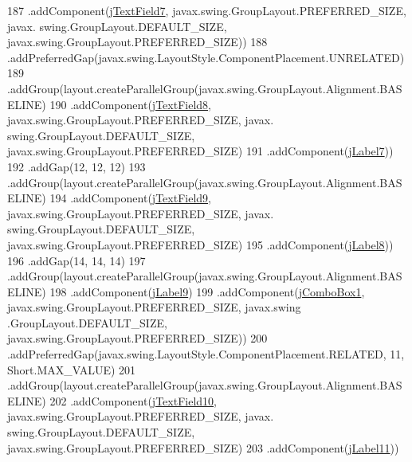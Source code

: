 \begin{DoxyCode}
187                     .addComponent(\mbox{\hyperlink{class_interfaz_package_1_1_alta_libro_texto_af62a5b21c777c6bcb18074f1aeaed986}{jTextField7}}, javax.swing.GroupLayout.PREFERRED\_SIZE, javax.
      swing.GroupLayout.DEFAULT\_SIZE, javax.swing.GroupLayout.PREFERRED\_SIZE))
188                 .addPreferredGap(javax.swing.LayoutStyle.ComponentPlacement.UNRELATED)
189                 .addGroup(layout.createParallelGroup(javax.swing.GroupLayout.Alignment.BASELINE)
190                     .addComponent(\mbox{\hyperlink{class_interfaz_package_1_1_alta_libro_texto_a2d1f30b1c7ece5ce2c890c5595ecdbc7}{jTextField8}}, javax.swing.GroupLayout.PREFERRED\_SIZE, javax.
      swing.GroupLayout.DEFAULT\_SIZE, javax.swing.GroupLayout.PREFERRED\_SIZE)
191                     .addComponent(\mbox{\hyperlink{class_interfaz_package_1_1_alta_libro_texto_a2ad918dee833595289fcf66c1d1933ef}{jLabel7}}))
192                 .addGap(12, 12, 12)
193                 .addGroup(layout.createParallelGroup(javax.swing.GroupLayout.Alignment.BASELINE)
194                     .addComponent(\mbox{\hyperlink{class_interfaz_package_1_1_alta_libro_texto_a089a5e28cbdf761694e6edd1136f8630}{jTextField9}}, javax.swing.GroupLayout.PREFERRED\_SIZE, javax.
      swing.GroupLayout.DEFAULT\_SIZE, javax.swing.GroupLayout.PREFERRED\_SIZE)
195                     .addComponent(\mbox{\hyperlink{class_interfaz_package_1_1_alta_libro_texto_a6af032fd25dc61f681ff44cc8e561afe}{jLabel8}}))
196                 .addGap(14, 14, 14)
197                 .addGroup(layout.createParallelGroup(javax.swing.GroupLayout.Alignment.BASELINE)
198                     .addComponent(\mbox{\hyperlink{class_interfaz_package_1_1_alta_libro_texto_af230caad4def2d93c0ebd623faf2dd01}{jLabel9}})
199                     .addComponent(\mbox{\hyperlink{class_interfaz_package_1_1_alta_libro_texto_a3413630b2b16f449c4ea9455da599211}{jComboBox1}}, javax.swing.GroupLayout.PREFERRED\_SIZE, javax.swing
      .GroupLayout.DEFAULT\_SIZE, javax.swing.GroupLayout.PREFERRED\_SIZE))
200                 .addPreferredGap(javax.swing.LayoutStyle.ComponentPlacement.RELATED, 11, Short.MAX\_VALUE)
201                 .addGroup(layout.createParallelGroup(javax.swing.GroupLayout.Alignment.BASELINE)
202                     .addComponent(\mbox{\hyperlink{class_interfaz_package_1_1_alta_libro_texto_ac8b1eeb9a66899467821be3b3a5b08f4}{jTextField10}}, javax.swing.GroupLayout.PREFERRED\_SIZE, javax.
      swing.GroupLayout.DEFAULT\_SIZE, javax.swing.GroupLayout.PREFERRED\_SIZE)
203                     .addComponent(\mbox{\hyperlink{class_interfaz_package_1_1_alta_libro_texto_a162463c516b899f292e7b5b96e2daeb2}{jLabel11}}))

\end{DoxyCode}
